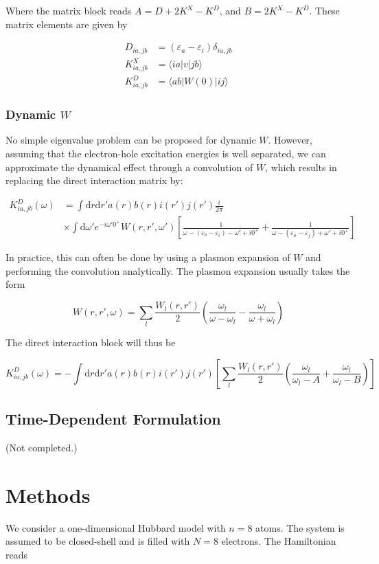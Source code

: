 \documentclass{article}
\begin{document}
Where the matrix block reads $A=D+2K^X-K^D$, and $B=2K^X-K^D$. These matrix elements are given by

$$
\begin{aligned}
D_{ia,jb}&=(\varepsilon_a-\varepsilon_i)\delta_{ia,jb}\\
K^X_{ia,jb}&=\langle ia|v|jb\rangle\\
K^D_{ia,jb}&=\langle ab|W(0)|ij\rangle
\end{aligned}
$$

\subsubsection{Dynamic $W$}

No simple eigenvalue problem can be proposed for dynamic $W$. However, assuming that the electron-hole excitation energies is well separated, we can approximate the dynamical effect through a convolution of $W$, which results in replacing the direct interaction matrix by:

$$
\begin{aligned}
K^D_{ia,jb}(\omega)&=\int\mathrm dr\mathrm dr'a(r)b(r)i(r')j(r')\frac{i}{2\pi}\\
&\times\int\mathrm d\omega'e^{-i\omega' 0^+}W(r,r',\omega')\left[\frac1{\omega-(\varepsilon_b-\varepsilon_i)-\omega'+i0^+}+\frac1{\omega-(\varepsilon_a-\varepsilon_j)+\omega'+i0^+}\right]
\end{aligned}
$$

In practice, this can often be done by using a plasmon expansion of $W$ and performing the convolution analytically. The plasmon expansion usually takes the form

$$
W(r,r', \omega)= \sum_{l} \frac{W_{l}(r, r')}2 \left(\frac{\omega_{l}}{\omega-\omega_{l}}-\frac{\omega_{l}}{\omega+\omega_{l}}\right)
$$

The direct interaction block will thus be

$$
K^D_{ia,jb}(\omega)=-\int\mathrm dr\mathrm dr'a(r)b(r)i(r')j(r')\left[\sum_l\frac{W_{l}(r, r')}2 \left(\frac{\omega_{l}}{\omega_{l}-A}+\frac{\omega_{l}}{\omega_{l}-B}\right)\right]
$$

\subsection{Time-Dependent Formulation}
(Not completed.)
\section{Methods}
We consider a one-dimensional Hubbard model with $n=8$ atoms. The system is assumed to be closed-shell and is filled with $N=8$ electrons. The Hamiltonian reads
\end{document}
